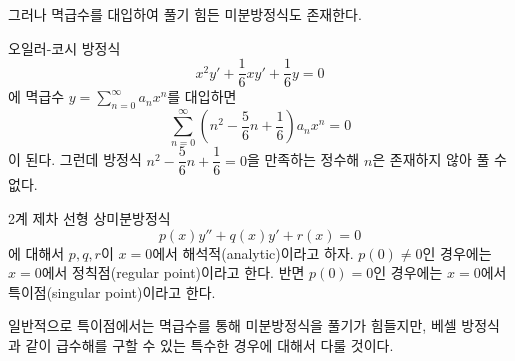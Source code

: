 \documentclass[../engineering_mathematics_lecture_note.tex]{subfiles}
\begin{document}
그러나 멱급수를 대입하여 풀기 힘든 미분방정식도 존재한다.
\begin{example}
    오일러-코시 방정식
    \begin{equation*}
        x^2 y' + \frac 16 x y' + \frac 16 y = 0
    \end{equation*}
    에 멱급수 $y = \sum_{n = 0}^\infty a_n x^n$를 대입하면
    \begin{equation*}
        \sum^{\infty}_{n = 0} \left( n^2 - \frac 56 n + \frac 16 \right) a_n x^n = 0
    \end{equation*}
    이 된다.
    그런데 방정식 $n^2 - \dfrac 56 n + \dfrac 16 = 0$을 만족하는 정수해 $n$은 존재하지 않아 풀 수 없다.
\end{example}

\begin{definition}
    2계 제차 선형 상미분방정식
    \begin{equation*}
        p(x) y'' + q(x) y' + r(x) = 0
    \end{equation*}
    에 대해서 $p, q, r$이 $x = 0$에서 해석적(analytic)이라고 하자.
    $p(0) \neq 0$인 경우에는 $x = 0$에서 정칙점(regular point)이라고 한다.
    반면 $p(0) = 0$인 경우에는 $x = 0$에서 특이점(singular point)이라고 한다.
\end{definition}

일반적으로 특이점에서는 멱급수를 통해 미분방정식을 풀기가 힘들지만, 베셀 방정식과 같이 급수해를 구할 수 있는 특수한 경우에 대해서 다룰 것이다.
\end{document}
